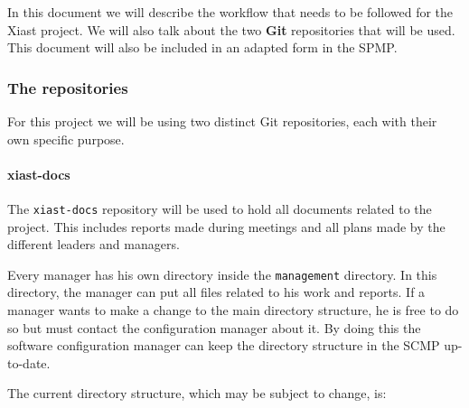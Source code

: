 \documentclass[12pt]{article}
\begin{document}
In this document we will describe the workflow that needs to be followed
for the Xiast project. We will also talk about the two \textbf{Git}
repositories that will be used. This document will also be included in
an adapted form in the SPMP.

\subsubsection{The repositories}\label{the-repositories}

For this project we will be using two distinct Git repositories, each
with their own specific purpose.

\paragraph{xiast-docs}\label{xiast-docs}

The \texttt{xiast-docs} repository will be used to hold all documents
related to the project. This includes reports made during meetings and
all plans made by the different leaders and managers.

Every manager has his own directory inside the \texttt{management}
directory. In this directory, the manager can put all files related to
his work and reports. If a manager wants to make a change to the main
directory structure, he is free to do so but must contact the
configuration manager about it. By doing this the software configuration
manager can keep the directory structure in the SCMP up-to-date.

The current directory structure, which may be subject to change, is:
\end{document}
